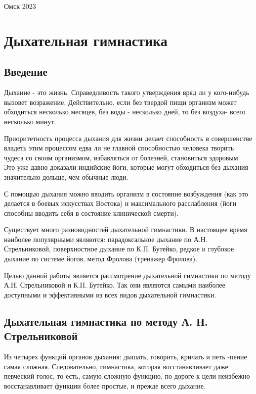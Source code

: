 \documentclass[14pt, a4paper]{article}
\begin{document}
    \vspace*{\fill}
    \begin{center}
        Омск 2023
    \end{center}

    \newpage

    \tableofcontents

    \newpage

    \section{Дыхательная гимнастика}

    \subsection{Введение}
    Дыхание - это жизнь. Справедливость такого утверждения вряд ли у кого-нибудь вызовет возражение. Действительно, если без твердой пищи организм может обходиться несколько месяцев, без воды - несколько дней, то без воздуха- всего несколько минут.

    Приоритетность процесса дыхания для жизни делает способность в совершенстве владеть этим процессом едва ли не главной способностью человека творить чудеса со своим организмом, избавляться от болезней, становиться здоровым. Это уже давно доказали индийские йоги, которые могут обходиться без дыхания значительно дольше, чем обычные люди.

    С помощью дыхания можно вводить организм в состояние возбуждения (как это делается в боевых искусствах Востока) и максимального расслабления (йоги способны вводить себя в состояние клинической смерти).

    Существует много разновидностей дыхательной гимнастики. В настоящее время наиболее популярными являются: парадоксальное дыхание по А.Н. Стрельниковой, поверхностное дыхание по К.П. Бутейко, редкое и глубокое дыхание по системе йогов, метод Фролова (тренажер Фролова).

    Целью данной работы является рассмотрение дыхательной гимнастики по методу А.Н. Стрельниковой и К.П. Бутейко. Так они являются самыми наиболее доступными и эффективными из всех видов дыхательной гимнастики.

    \subsection{Дыхательная гимнастика по методу А. Н. Стрельниковой}
    Из четырех функций органов дыхания: дышать, говорить, кричать и петь -пение самая сложная. Следовательно, гимнастика, которая восстанавливает даже певческий голос, то есть, самую сложную функцию, по дороге к цели неизбежно восстанавливает функции более простые, и прежде всего дыхание.
\end{document}
